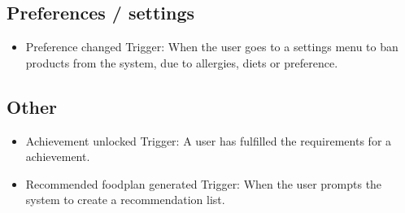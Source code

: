 \subsection{Preferences / settings}
\begin{itemize}
\item Preference changed
	\subitem Trigger: When the user goes to a settings menu to ban products from the system, due to allergies, diets or preference.
\end{itemize}


\subsection{Other}
\begin{itemize}
\item Achievement unlocked
	\subitem Trigger: A user has fulfilled the requirements for a achievement.
\item Recommended foodplan generated
	\subitem Trigger: When the user prompts the system to create a recommendation list.
\end{itemize}

